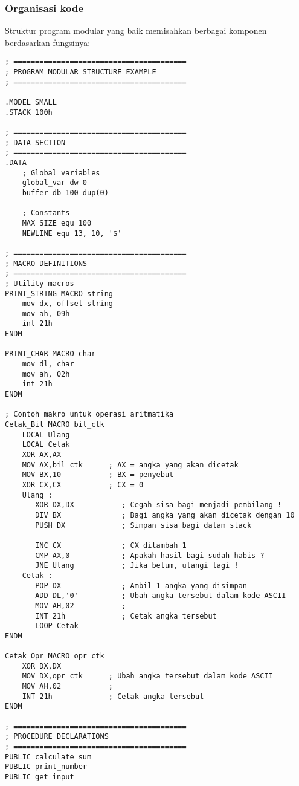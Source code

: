\documentclass[../main.tex]{subfiles}
\begin{document}
        \subsubsection{Organisasi kode}
            Struktur program modular yang baik memisahkan berbagai komponen berdasarkan fungsinya:

            \begin{lstlisting}[language={[x86masm]Assembler}, caption=Struktur Program Modular, label={lst:modular-structure}]
; ========================================
; PROGRAM MODULAR STRUCTURE EXAMPLE
; ========================================

.MODEL SMALL
.STACK 100h

; ========================================
; DATA SECTION
; ========================================
.DATA
    ; Global variables
    global_var dw 0
    buffer db 100 dup(0)
    
    ; Constants
    MAX_SIZE equ 100
    NEWLINE equ 13, 10, '$'

; ========================================
; MACRO DEFINITIONS
; ========================================
; Utility macros
PRINT_STRING MACRO string
    mov dx, offset string
    mov ah, 09h
    int 21h
ENDM

PRINT_CHAR MACRO char
    mov dl, char
    mov ah, 02h
    int 21h
ENDM

; Contoh makro untuk operasi aritmatika
Cetak_Bil MACRO bil_ctk
    LOCAL Ulang
    LOCAL Cetak
    XOR AX,AX
    MOV AX,bil_ctk      ; AX = angka yang akan dicetak 
    MOV BX,10           ; BX = penyebut 
    XOR CX,CX           ; CX = 0 
    Ulang : 
       XOR DX,DX           ; Cegah sisa bagi menjadi pembilang ! 
       DIV BX              ; Bagi angka yang akan dicetak dengan 10 
       PUSH DX             ; Simpan sisa bagi dalam stack

       INC CX              ; CX ditambah 1 
       CMP AX,0            ; Apakah hasil bagi sudah habis ? 
       JNE Ulang           ; Jika belum, ulangi lagi ! 
    Cetak : 
       POP DX              ; Ambil 1 angka yang disimpan 
       ADD DL,'0'          ; Ubah angka tersebut dalam kode ASCII 
       MOV AH,02           ; 
       INT 21h             ; Cetak angka tersebut 
       LOOP Cetak
ENDM

Cetak_Opr MACRO opr_ctk
    XOR DX,DX
    MOV DX,opr_ctk      ; Ubah angka tersebut dalam kode ASCII 
    MOV AH,02           ; 
    INT 21h             ; Cetak angka tersebut
ENDM

; ========================================
; PROCEDURE DECLARATIONS
; ========================================
PUBLIC calculate_sum
PUBLIC print_number
PUBLIC get_input


\end{lstlisting}
\end{document}

